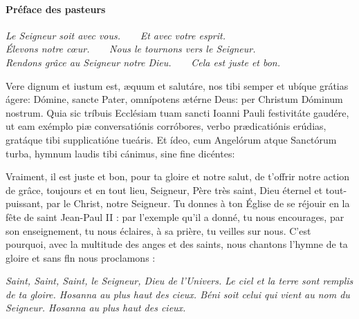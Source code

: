 \documentclass[twoside]{article}
\begin{document}
\paragraph{Préface des pasteurs}


\emph{\vv Le Seigneur soit avec vous.~~~~\rr Et avec votre esprit.\\
\vv Élevons notre cœur.~~~~\rr Nous le tournons vers le Seigneur.\\
\vv Rendons grâce au Seigneur notre Dieu.~~~~\rr Cela est juste et bon.}

\begin{paracol}{2}
\switchcolumn
\switchcolumn*

Vere dignum et iustum est, æquum et salutáre,
nos tibi semper et ubíque grátias ágere:
Dómine, sancte Pater, omnípotens ætérne Deus:
per Christum Dóminum nostrum.
Quia sic tríbuis Ecclésiam tuam sancti Ioanni Pauli festivitáte gaudére,
ut eam exémplo piæ conversatiónis corróbores,
verbo prædicatiónis erúdias,
gratáque tibi supplicatióne tueáris.
Et ídeo, cum Angelórum atque Sanctórum turba,
hymnum laudis tibi cánimus, sine fine dicéntes: 

\switchcolumn

Vraiment, il est juste et bon,
pour ta gloire et notre salut,
de t'offrir notre action de grâce,
toujours et en tout lieu,
Seigneur, Père très saint,
Dieu éternel et tout-puissant,
par le Christ, notre Seigneur.
Tu donnes à ton Église de se réjouir
en la fête de saint Jean-Paul II :
par l'exemple qu'il a donné, tu nous encourages,
par son enseignement, tu nous éclaires,
à sa prière, tu veilles sur nous.
C'est pourquoi,
avec la multitude des anges et des saints,
nous chantons l'hymne de ta gloire
et sans fln nous proclamons :

\end{paracol}

\newpage

\emph{Saint, Saint, Saint, le Seigneur, Dieu de l'Univers. Le ciel et la terre sont remplis de ta gloire. Hosanna au plus haut des cieux. Béni soit celui qui vient au nom du Seigneur. Hosanna au plus haut des cieux.}
\end{document}
